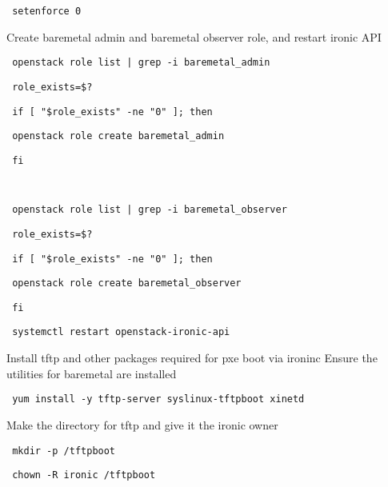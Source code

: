\documentclass[12pt]{article}
\begin{document}
\begin{bash}\texttt{\small{ setenforce 0}}\end{bash}

Create baremetal admin and baremetal observer role, and restart ironic API

\begin{bash}\texttt{\small{ openstack role list | grep -i baremetal\_admin}}\end{bash}
\begin{bash}\texttt{\small{ role\_exists=\$?}}\end{bash}
\begin{bash}\texttt{\small{ if [ "\${role\_exists}" -ne "0" ]; then }}\end{bash}
\begin{bash}\texttt{\small{     openstack role create baremetal\_admin}}\end{bash}
\begin{bash}\texttt{\small{ fi}}\end{bash}
\begin{bash}\texttt{\small{ }}\end{bash}
\begin{bash}\texttt{\small{ openstack role list | grep -i baremetal\_observer }}\end{bash}
\begin{bash}\texttt{\small{ role\_exists=\$?}}\end{bash}
\begin{bash}\texttt{\small{ if [ "\${role\_exists}" -ne "0" ]; then}}\end{bash}
\begin{bash}\texttt{\small{     openstack role create baremetal\_observer}}\end{bash}
\begin{bash}\texttt{\small{ fi}}\end{bash}
\begin{bash}\texttt{\small{ systemctl restart openstack-ironic-api}}\end{bash}

Install tftp and other packages required for pxe boot via ironinc
Ensure the utilities for baremetal are installed

\begin{bash}\texttt{\small{ yum install -y tftp-server syslinux-tftpboot xinetd}}\end{bash}

Make the directory for tftp and give it the ironic owner

\begin{bash}\texttt{\small{ mkdir -p /tftpboot}}\end{bash}
\begin{bash}\texttt{\small{ chown -R ironic /tftpboot}}\end{bash}
\end{document}
